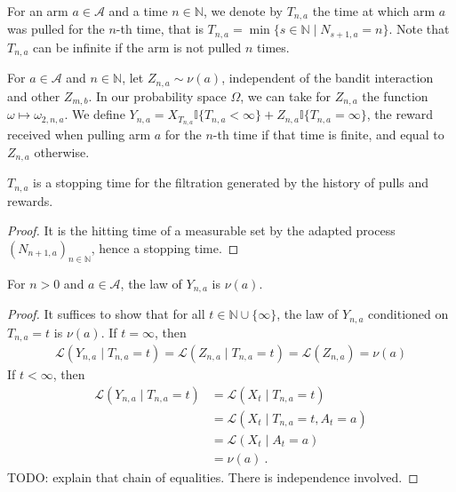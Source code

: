\begin{definition}\label{def:stepsUntil}
  \leanok
For an arm $a \in \mathcal{A}$ and a time $n \in \mathbb{N}$, we denote by $T_{n,a}$ the time at which arm $a$ was pulled for the $n$-th time, that is $T_{n,a} = \min\{s \in \mathbb{N} \mid N_{s+1,a} = n\}$.
Note that $T_{n, a}$ can be infinite if the arm is not pulled $n$ times.
\end{definition}


\begin{definition}\label{def:rewardByCount}
  \leanok
For $a \in \mathcal{A}$ and $n \in \mathbb{N}$, let $Z_{n,a} \sim \nu(a)$, independent of the bandit interaction and other $Z_{m,b}$.
In our probability space $\Omega$, we can take for $Z_{n,a}$ the function $\omega \mapsto \omega_{2,n,a}$.
We define $Y_{n, a} = X_{T_{n,a}} \mathbb{I}\{T_{n, a} < \infty\} + Z_{n,a} \mathbb{I}\{T_{n, a} = \infty\}$, the reward received when pulling arm $a$ for the $n$-th time if that time is finite, and equal to $Z_{n,a}$ otherwise.
\end{definition}


\begin{lemma}\label{lem:isStoppingTime_stepsUntil}
$T_{n,a}$ is a stopping time for the filtration generated by the history of pulls and rewards.
\end{lemma}

\begin{proof}
It is the hitting time of a measurable set by the adapted process $(N_{n+1, a})_{n \in \mathbb{N}}$, hence a stopping time.
\end{proof}


\begin{lemma}\label{lem:hasLaw_rewardByCount}
  \leanok
For $n > 0$ and $a \in \mathcal{A}$, the law of $Y_{n,a}$ is $\nu(a)$.
\end{lemma}

\begin{proof}
It suffices to show that for all $t \in \mathbb{N} \cup \{\infty\}$, the law of $Y_{n,a}$ conditioned on $T_{n,a} = t$ is $\nu(a)$.
If $t = \infty$, then
\begin{align*}
  \mathcal{L}(Y_{n,a} \mid T_{n,a} = t)
  = \mathcal{L}(Z_{n,a} \mid T_{n,a} = t)
  = \mathcal{L}(Z_{n,a})
  = \nu(a)
\end{align*}
If $t < \infty$, then
\begin{align*}
  \mathcal{L}(Y_{n,a} \mid T_{n,a} = t)
  &= \mathcal{L}(X_t \mid T_{n,a} = t)
  \\
  &= \mathcal{L}(X_t \mid T_{n,a} = t, A_t = a)
  \\
  &= \mathcal{L}(X_t \mid A_t = a)
  \\
  &= \nu(a)
  \: .
\end{align*}
TODO: explain that chain of equalities. There is independence involved.
\end{proof}


